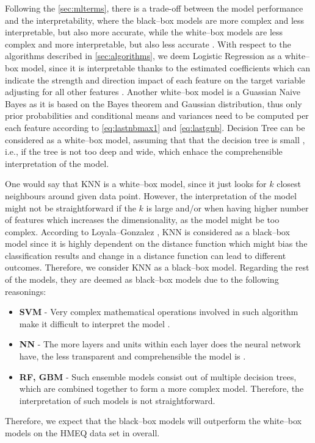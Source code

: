 Following the \autoref{sec:mlterms}, there is a trade-off between the model performance and the interpretability, where the black--box models are more complex and less interpretable, but also more accurate, while the white--box models are less complex and more interpretable, but also less accurate \citep{pintelas2020grey}.
With respect to the algorithms described in \autoref{sec:algorithms}, we deem Logistic Regression as a white--box model, since it is interpretable thanks to the estimated coefficients which can indicate the strength and direction impact of each feature on the target variable adjusting for all other features \citep{park2013introduction}.
Another white--box model is a Guassian Naive Bayes as it is based on the Bayes theorem and Gaussian distribution, thus only prior probabilities and conditional means and variances need to be computed per each feature according to \autoref{eq:lastnbmax1} and \autoref{eq:lastgnb}.
Decision Tree can be considered as a white--box model, assuming that that the decision tree is small \citep{goethals2022non}, i.e., if the tree is not too deep and wide, which enhace the comprehensible interpretation of the model.

One would say that KNN is a white--box model, since it just looks for $k$ closest neighbours around given data point. However, the interpretation of the model might not be straightforward if the $k$ is large and/or when having higher number of features which increases the dimensionality, as the model might be too complex.
According to Loyala--Gonzalez \citep{loyola2019black}, KNN is considered as a black--box model since it is highly dependent on the distance function which might bias the classification results and change in a distance function can lead to different outcomes. Therefore, we consider KNN as a black--box model.
Regarding the rest of the models, they are deemed as black--box models due to the following reasonings:
\begin{itemize}\setlength\itemsep{0em}
    \item \textbf{SVM} - Very complex mathematical operations involved in such algorithm make it difficult to interpret the model \citep{loyola2019black}.
    \item \textbf{NN} - The more layers and units within each layer does the neural network have, the less transparent and comprehensible the model is \citep{bathaee2017artificial}.
    \item \textbf{RF, GBM} - Such ensemble models consist out of multiple decision trees, which are combined together to form a more complex model. Therefore, the interpretation of such models is not straightforward.
\end{itemize}
Therefore, we expect that the black--box models will outperform the white--box models on the HMEQ data set in overall.

